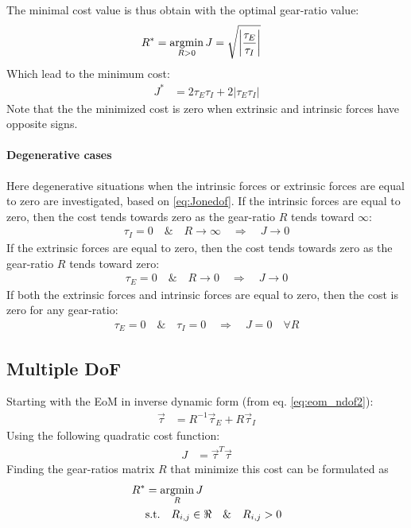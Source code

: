 The minimal cost value is thus obtain with the optimal gear-ratio value:
%
\begin{align}
R^*    &=  \operatornamewithlimits{argmin}\limits_{ R > 0 } J = \sqrt{ \left| \frac{\tau_E}{\tau_I} \right|} 
\end{align}
%
Which lead to the minimum cost:
%
\begin{align}
J^*    &=  2 \tau_E \tau_I  + 2 \left| \tau_E \tau_I \right| 
\end{align}
%
Note that the the minimized cost is zero when extrinsic and intrinsic forces have opposite signs.

\paragraph{Degenerative cases}
Here degenerative situations when the intrinsic forces or extrinsic forces are equal to zero are investigated, based on \eqref{eq:Jonedof}.
%
If the intrinsic forces are equal to zero, then the cost tends towards zero as the gear-ratio $R$ tends toward $\infty$:
%
\begin{align}
\tau_I = 0 \quad \& \quad R \rightarrow \infty \quad \Rightarrow \quad J \rightarrow 0
\end{align}
%
If the extrinsic forces are equal to zero, then the cost tends towards zero as the gear-ratio $R$ tends toward zero:
%
\begin{align}
\tau_E = 0 \quad \& \quad R \rightarrow 0 \quad \Rightarrow \quad J \rightarrow 0
\end{align}
%
If both the extrinsic forces and intrinsic forces are equal to zero, then the cost is zero for any gear-ratio:
%
\begin{align}
\tau_E = 0 \quad \& \quad \tau_I = 0 \quad \Rightarrow \quad J = 0  \quad \forall R
\end{align}
%


\subsection{Multiple DoF}
\label{sec:optgearproofn}

Starting with the EoM in inverse dynamic form (from eq. \eqref{eq:eom_ndof2}):
%
\begin{align}
\vec{ \tau } &=  R^{-1} \vec{\tau}_E + R \vec{\tau}_I
\end{align}
%
Using the following quadratic cost function:
%
\begin{align}
J &=  \vec{ \tau }^T \vec{ \tau }
\end{align}
%
Finding the gear-ratios matrix $R$ that minimize this cost can be formulated as
%
\begin{align}
R^* &=  \operatornamewithlimits{argmin}\limits_{R} J \\
    &   \text{s.t.} \quad R_{i,j} \in \Re  \quad \& \quad R_{i,j} > 0  
\end{align}
%

